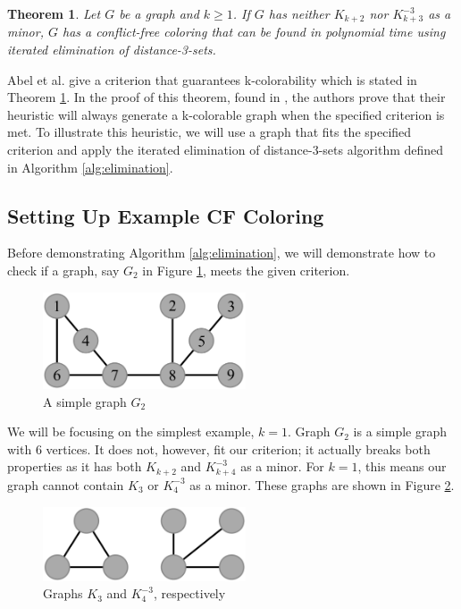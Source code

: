 \documentclass{sig-alternate}
\newtheorem{theorem}{Theorem}
\begin{document}
\begin{theorem} \label{thm:criterion}
Let $G$ be a graph and $k \geq 1$. If $G$ has neither $K_{k+2}$ nor $K_{k+3}^{-3}$ as a minor, $G$ has a conflict-free coloring that can be found in polynomial time using iterated elimination of distance-3-sets.
\end{theorem}

Abel et al. give a criterion that guarantees k-colorability which is stated in Theorem \ref{thm:criterion}. In the proof of this theorem, found in \cite{abel2017three}, the authors prove that their heuristic will always generate a k-colorable graph when the specified criterion is met. To illustrate this heuristic, we will use a graph that fits the specified criterion and apply the iterated elimination of distance-3-sets algorithm defined in Algorithm \ref{alg:elimination}.

\subsection{Setting Up Example CF Coloring}
Before demonstrating Algorithm \ref{alg:elimination}, we will demonstrate how to check if a graph, say $G_2$ in Figure \ref{fig:criterion}, meets the given criterion.

\begin{figure}[h]
	\centering
	\includegraphics[width=6cm]{../figures/criterion.pdf}
	\caption{A simple graph $G_2$}\label{fig:criterion}
\end{figure}

We will be focusing on the simplest example, $k = 1$. Graph $G_2$ is a simple graph with 6 vertices. It does not, however, fit our criterion; it actually breaks both properties as it has both $K_{k+2}$ and $K_{k+4}^{-3}$ as a minor. For $k = 1$, this means our graph cannot contain $K_{3}$ or $K_{4}^{-3}$ as a minor. These graphs are shown in Figure \ref{fig:bad-criterion}.

\begin{figure}[h]
	\centering
	\includegraphics[width=6cm]{../figures/bad-criterion.pdf}
	\caption{Graphs $K_{3}$ and $K_{4}^{-3}$, respectively}\label{fig:bad-criterion}
\end{figure}
\end{document}
